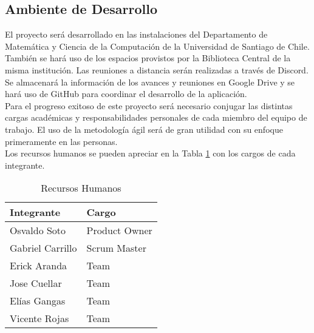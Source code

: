 \subsection{Ambiente de Desarrollo}
El proyecto será desarrollado en las instalaciones del Departamento de Matemática y Ciencia de la Computación de la Universidad de Santiago de Chile. También se hará uso de los espacios provistos por la Biblioteca Central de la misma institución.
Las reuniones a distancia serán realizadas a través de Discord. Se almacenará la información de los avances y reuniones en Google Drive y se hará uso de GitHub para coordinar el desarrollo de la aplicación.\\
Para el progreso exitoso de este proyecto será necesario conjugar las distintas cargas académicas y responsabilidades personales de cada miembro del equipo de trabajo. El uso de la metodología ágil será de gran utilidad con su enfoque primeramente en las personas.\\
Los recursos humanos se pueden apreciar en la Tabla \ref{table:3} con los cargos de cada integrante.
\begin{table}[H]
    \centering
    \caption{Recursos Humanos}
	\vspace{0.2cm}
    \begin{tabular}{|l|l|} \hline
        \textbf{Integrante} & \textbf{Cargo}\\ \hline
		Osvaldo Soto & Product Owner\\\hline
		Gabriel Carrillo & Scrum Master\\\hline
		Erick Aranda & Team\\\hline
		Jose Cuellar & Team\\\hline
         Elías Gangas & Team\\\hline
         Vicente Rojas & Team\\\hline
    \end{tabular}
    
    \label{table:3}
\end{table}

